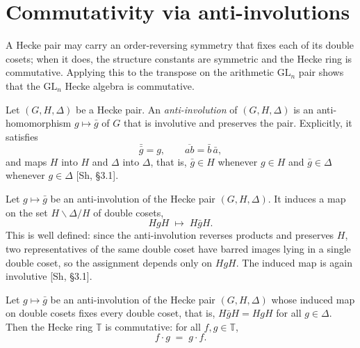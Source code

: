 \chapter{Commutativity via anti-involutions}\label{chap:commutativity}

A Hecke pair may carry an order-reversing symmetry that fixes each of its double cosets; when
it does, the structure constants are symmetric and the Hecke ring is commutative. Applying this
to the transpose on the arithmetic $\mathrm{GL}_n$ pair shows that the $\mathrm{GL}_n$ Hecke
algebra is commutative.

\begin{definition}\label{def:anti-involution}
\leanok
{}
Let $(G,H,\Delta)$ be a Hecke pair. An \emph{anti-involution} of $(G,H,\Delta)$ is an
anti-homomorphism $g\mapsto\bar g$ of $G$ that is involutive and preserves the pair. Explicitly,
it satisfies
\[
  \bar{\bar g}=g,\qquad \overline{ab}=\bar b\,\bar a,
\]
and maps $H$ into $H$ and $\Delta$ into $\Delta$, that is, $\bar g\in H$ whenever $g\in H$ and
$\bar g\in\Delta$ whenever $g\in\Delta$ [Sh, \S3.1].
\end{definition}

\begin{definition}\label{def:onHeckeCoset}
\leanok
{}
Let $g\mapsto\bar g$ be an anti-involution of the Hecke pair $(G,H,\Delta)$. It induces a map on
the set $H\backslash\Delta/H$ of double cosets,
\[
  HgH \;\longmapsto\; H\bar gH .
\]
This is well defined: since the anti-involution reverses products and preserves $H$, two
representatives of the same double coset have barred images lying in a single double coset, so
the assignment depends only on $HgH$. The induced map is again involutive [Sh, \S3.1].
\end{definition}

\begin{theorem}\label{thm:mul-comm-of-ai}
\leanok
{}
Let $g\mapsto\bar g$ be an anti-involution of the Hecke pair $(G,H,\Delta)$ whose induced map on
double cosets fixes every double coset, that is, $H\bar gH=HgH$ for all $g\in\Delta$. Then the
Hecke ring $\mathbb{T}$ is commutative: for all $f,g\in\mathbb{T}$,
\[
  f\cdot g \;=\; g\cdot f .
\]
\end{theorem}

